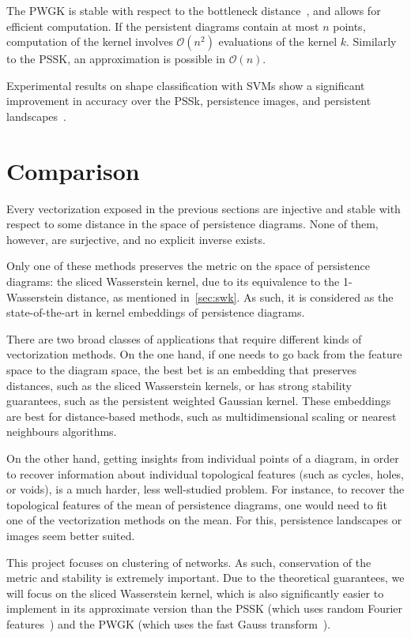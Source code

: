 \documentclass[a4paper,11pt,openany,extrafontsizes]{memoir}
\begin{document}
The PWGK is stable with respect to the bottleneck
distance~\cite{kusano_kernel_2017}, and allows for efficient
computation. If the persistent diagrams contain at most $n$ points,
computation of the kernel involves $\mathcal{O}(n^2)$ evaluations of
the kernel $k$. Similarly to the PSSK, an approximation is possible in
$\mathcal{O}(n)$.

Experimental results on shape classification with SVMs show a
significant improvement in accuracy over the PSSk, persistence images,
and persistent landscapes~\cite{kusano_kernel_2017}.

\section{Comparison}%
\label{sec:comparison}

Every vectorization exposed in the previous sections are injective and
stable with respect to some distance in the space of persistence
diagrams. None of them, however, are surjective, and no explicit
inverse exists.

Only one of these methods preserves the metric on the space of
persistence diagrams: the sliced Wasserstein kernel, due to its
equivalence to the 1-Wasserstein distance, as mentioned
in~\autoref{sec:swk}. As such, it is considered as the
state-of-the-art in kernel embeddings of persistence diagrams.

There are two broad classes of applications that require different
kinds of vectorization methods. On the one hand, if one needs to go
back from the feature space to the diagram space, the best bet is an
embedding that preserves distances, such as the sliced Wasserstein
kernels, or has strong stability guarantees, such as the persistent
weighted Gaussian kernel. These embeddings are best for distance-based
methods, such as multidimensional scaling or nearest neighbours
algorithms.

On the other hand, getting insights from individual points of a
diagram, in order to recover information about individual topological
features (such as cycles, holes, or voids), is a much harder, less
well-studied problem. For instance, to recover the topological
features of the mean of persistence diagrams, one would need to fit
one of the vectorization methods on the mean. For this, persistence
landscapes or images seem better suited.

This project focuses on clustering of networks. As such, conservation
of the metric and stability is extremely important. Due to the
theoretical guarantees, we will focus on the sliced Wasserstein
kernel, which is also significantly easier to implement in its
approximate version than the PSSK (which uses random Fourier
features~\cite{reininghaus_stable_2015}) and the PWGK (which uses the
fast Gauss transform~\cite{kusano_kernel_2017}).
\end{document}
